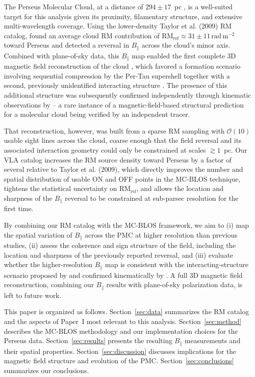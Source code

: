 \documentclass[twocolumn]{aastex631}
\begin{document}
The Perseus Molecular Cloud, at a distance of $294\pm17$~pc \citep{zucker2018}, is a well-suited target for this analysis given its proximity, filamentary structure, and extensive multi-wavelength coverage. Using the lower-density Taylor et al. (2009) RM catalog, \citet{tahani2018} found an average cloud RM contribution of $\mathrm{RM_{ref}} \approx 31 \pm 11\,\mathrm{rad\,m^{-2}}$ toward Perseus and detected a reversal in $B_\parallel$ across the cloud's minor axis. Combined with plane-of-sky data, this $B_\parallel$ map enabled the first complete 3D magnetic field reconstruction of the cloud \citep{tahani2022b}, which favored a formation scenario involving sequential compression by the Per-Tau supershell together with a second, previously unidentified interacting structure \citep[cf.][]{bialy2021}. The presence of this additional structure was subsequently confirmed independently through kinematic observations by \citet{kounkel2022} -- a rare instance of a magnetic-field-based structural prediction for a molecular cloud being verified by an independent tracer.

That reconstruction, however, was built from a sparse RM sampling with $\mathcal{O}(10)$ usable sight lines across the cloud, coarse enough that the field reversal and its associated interaction geometry could only be constrained at scales $\gtrsim 1$~pc. Our VLA catalog increases the RM source density toward Perseus by a factor of several relative to Taylor et al. (2009), which directly improves the number and spatial distribution of usable ON and OFF points in the MC-BLOS technique, tightens the statistical uncertainty on $\mathrm{RM_{ref}}$, and allows the location and sharpness of the $B_\parallel$ reversal to be constrained at sub-parsec resolution for the first time.

By combining our RM catalog with the MC-BLOS framework, we aim to (i) map the spatial variation of $B_\parallel$ across the PMC at higher resolution than previous studies, (ii) assess the coherence and sign structure of the field, including the location and sharpness of the previously reported reversal, and (iii) evaluate whether the higher-resolution $B_\parallel$ map is consistent with the interacting-structure scenario proposed by \citet{tahani2022b} and confirmed kinematically by \citet{kounkel2022}. A full 3D magnetic field reconstruction, combining our $B_\parallel$ results with plane-of-sky polarization data, is left to future work.

This paper is organized as follows. Section~\ref{sec:data} summarizes the RM catalog and the aspects of Paper~I most relevant to this analysis. Section~\ref{sec:method} describes the MC-BLOS methodology and our implementation choices for the Perseus data. Section~\ref{sec:results} presents the resulting $B_\parallel$ measurements and their spatial properties. Section~\ref{sec:discussion} discusses implications for the magnetic field structure and evolution of the PMC. Section~\ref{sec:conclusions} summarizes our conclusions.
\end{document}
